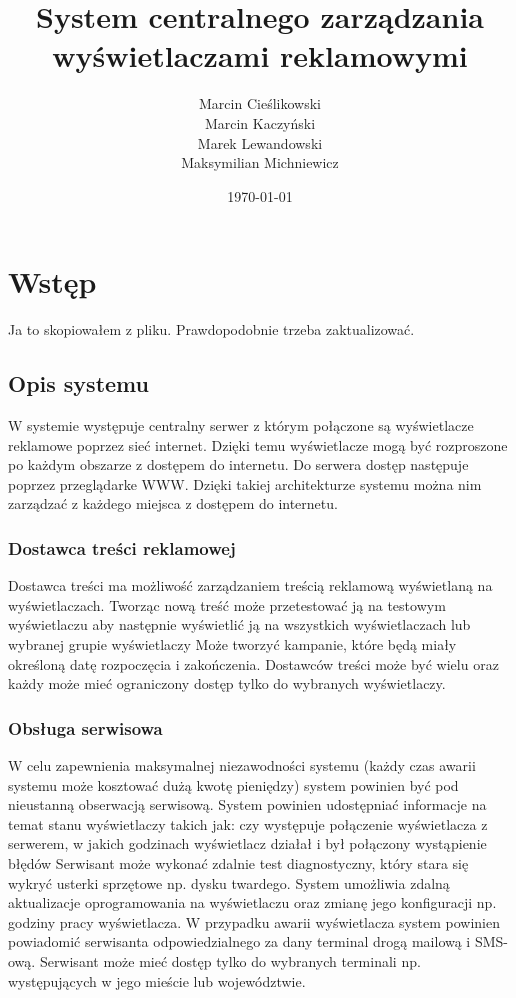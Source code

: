 \documentclass[a4paper,titlepage,twoside,openright]{report} %
\begin{document}
	

	\title{System centralnego zarządzania wyświetlaczami reklamowymi}
	\author{Marcin Cieślikowski\\
		Marcin Kaczyński\\
		Marek Lewandowski\\
		Maksymilian Michniewicz\\}
	\date{\today}
	\maketitle
	\tableofcontents
	\newpage
	

	\chapter{Wstęp}
		Ja to skopiowałem z pliku. Prawdopodobnie trzeba zaktualizować.
		\section{Opis systemu}
			W systemie występuje centralny serwer z którym połączone są wyświetlacze reklamowe poprzez sieć internet. Dzięki temu wyświetlacze mogą być rozproszone po każdym obszarze z dostępem do internetu. Do serwera dostęp następuje poprzez przeglądarke WWW. Dzięki takiej architekturze systemu można nim zarządzać z każdego miejsca z dostępem do internetu.
			\subsection{Dostawca treści reklamowej}
				Dostawca treści ma możliwość zarządzaniem treścią reklamową wyświetlaną na wyświetlaczach. Tworząc nową treść może przetestować ją na testowym wyświetlaczu aby następnie wyświetlić ją na wszystkich wyświetlaczach lub wybranej grupie wyświetlaczy Może tworzyć kampanie, które będą miały określoną datę rozpoczęcia i zakończenia. Dostawców treści może być wielu oraz każdy może mieć ograniczony dostęp tylko do wybranych wyświetlaczy.
			\subsection{Obsługa serwisowa}
				W celu zapewnienia maksymalnej niezawodności systemu (każdy czas awarii systemu może kosztować dużą kwotę pieniędzy) system powinien być pod nieustanną obserwacją serwisową. System powinien udostępniać informacje na temat stanu wyświetlaczy takich jak:
				czy występuje połączenie wyświetlacza z serwerem,
 				w jakich godzinach wyświetlacz działał i był połączony
 				wystąpienie błędów 
				Serwisant może wykonać zdalnie test diagnostyczny, który stara się wykryć usterki sprzętowe np. dysku twardego. System umożliwia zdalną aktualizacje oprogramowania na wyświetlaczu oraz zmianę jego konfiguracji np. godziny pracy wyświetlacza. W przypadku awarii wyświetlacza system powinien powiadomić serwisanta odpowiedzialnego za dany terminal drogą mailową i SMS-ową. Serwisant może mieć dostęp tylko do wybranych terminali np. występujących w jego mieście lub województwie. 
\end{document}
